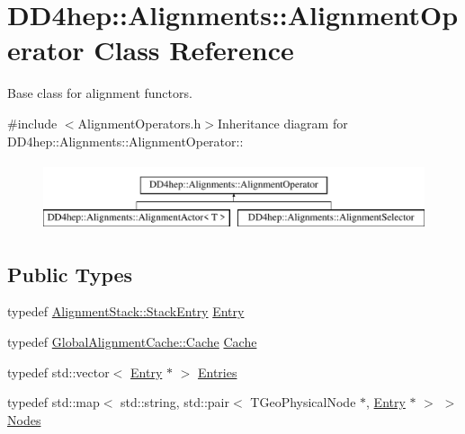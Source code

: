 \hypertarget{class_d_d4hep_1_1_alignments_1_1_alignment_operator}{
\section{DD4hep::Alignments::AlignmentOperator Class Reference}
\label{class_d_d4hep_1_1_alignments_1_1_alignment_operator}
}


Base class for alignment functors.  


{\ttfamily \#include $<$AlignmentOperators.h$>$}Inheritance diagram for DD4hep::Alignments::AlignmentOperator::\begin{figure}[H]
\begin{center}
\leavevmode
\includegraphics[height=2cm]{class_d_d4hep_1_1_alignments_1_1_alignment_operator}
\end{center}
\end{figure}
\subsection*{Public Types}
\begin{DoxyCompactItemize}
\item 
typedef \hyperlink{struct_d_d4hep_1_1_alignments_1_1_alignment_stack_1_1_stack_entry}{AlignmentStack::StackEntry} \hyperlink{class_d_d4hep_1_1_alignments_1_1_alignment_operator_a0dc91b46151c3685f152574147339899}{Entry}
\item 
typedef \hyperlink{class_d_d4hep_1_1_alignments_1_1_global_alignment_cache_a51cc6e8b7d9d85cfc296e8db7f360604}{GlobalAlignmentCache::Cache} \hyperlink{class_d_d4hep_1_1_alignments_1_1_alignment_operator_aa2e6502de3afb25286845cae785ab1d7}{Cache}
\item 
typedef std::vector$<$ \hyperlink{struct_d_d4hep_1_1_alignments_1_1_alignment_stack_1_1_stack_entry}{Entry} $\ast$ $>$ \hyperlink{class_d_d4hep_1_1_alignments_1_1_alignment_operator_ada83b10531c5774c75f6e8c224f55f4c}{Entries}
\item 
typedef std::map$<$ std::string, std::pair$<$ TGeoPhysicalNode $\ast$, \hyperlink{struct_d_d4hep_1_1_alignments_1_1_alignment_stack_1_1_stack_entry}{Entry} $\ast$ $>$ $>$ \hyperlink{class_d_d4hep_1_1_alignments_1_1_alignment_operator_a2f25eae1d38abc30a09f7a840ab0662a}{Nodes}
\end{DoxyCompactItemize}
